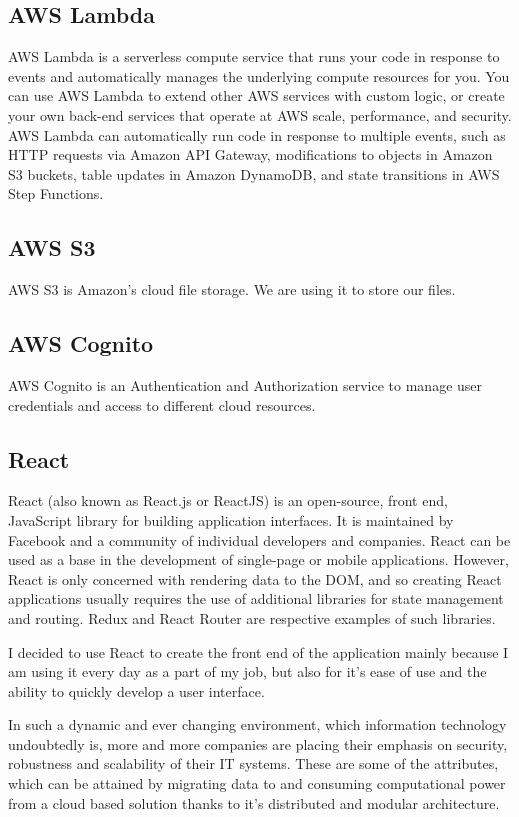 \documentclass[12pt,oneside]{fithesis2}
\begin{document}
\subsection*{AWS Lambda}
AWS Lambda is a serverless compute service that runs your code in response to events and automatically manages the underlying compute resources for you. You can use AWS Lambda to extend other AWS services with custom logic, or create your own back-end services that operate at AWS scale, performance, and security. AWS Lambda can automatically run code in response to multiple events, such as HTTP requests via Amazon API Gateway, modifications to objects in Amazon S3 buckets, table updates in Amazon DynamoDB, and state transitions in AWS Step Functions.
\subsection*{AWS S3}
AWS S3 is Amazon's cloud file storage. We are using it to store our files.
\subsection*{AWS Cognito}
AWS Cognito is an Authentication and Authorization service to manage user credentials and access to different cloud resources.
\subsection*{React}
React (also known as React.js or ReactJS) is an open-source, front end, JavaScript library for building application interfaces. It is maintained by Facebook and a community of individual developers and companies. React can be used as a base in the development of single-page or mobile applications. However, React is only concerned with rendering data to the DOM, and so creating React applications usually requires the use of additional libraries for state management and routing. Redux and React Router are respective examples of such libraries.
\par
I decided to use React to create the front end of the application mainly because I am using it every day as a part of my job, but also for it's ease of use and the ability to quickly develop a user interface.

In such a dynamic and ever changing environment, which information technology undoubtedly is, more and more companies are placing their emphasis on security, robustness and scalability of their IT systems. These are some of the attributes, which can be attained by migrating data to and consuming computational power from a cloud based solution thanks to it's distributed and modular architecture.
\end{document}

